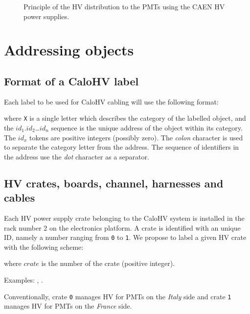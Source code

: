 \documentclass[12pt,a4paper]{article}
\newcommand{\pdftextimgpath}{./pdftex_t}
\begin{document}
\begin{figure}[h!]
  \begin{center}
    \scalebox{0.75}{}
  \end{center}
  \caption{Principle of  the HV distribution  to the PMTs  using the
    CAEN HV power supplies.}
  \label{fig:calohv:principle:1}
\end{figure}

\clearpage
\section{Addressing objects}

\subsection{Format of a CaloHV label}

Each label to be used for CaloHV cabling will use the following format:

\begin{center}
\end{center}
\noindent  where \texttt{X}  is a  single letter  which describes  the
category  of the  labelled  object,  and the  $id_1$.$id_2$\dots$id_n$
sequence is the unique address of the object within its category.  The
$id_x$ tokens are positive integers (possibly zero).  The \emph{colon}
character is  used to separate  the category letter from  the address.
The  sequence  of  identifiers  in  the  address  use  the  \emph{dot}
character as a separator.


\subsection{HV crates, boards, channel, harnesses and cables}

Each HV power supply crate belonging to the CaloHV system is installed
in the rack number 2 on the electronics platform.
A crate is identified with an unique ID, namely
a number ranging from \texttt{0} to \texttt{1}.  We propose to label a
given HV crate with the following scheme:
\begin{center}
 \end{center}
where \texttt{$crate$} is the number of the crate (positive integer).
\vskip     10pt    \par\noindent     Examples:    ,
.  \par Conventionally, crate \texttt{0} manages HV
for PMTs on the \emph{Italy} side  and crate \texttt{1} manages HV for
PMTs on the \emph{France} side.
\end{document}
